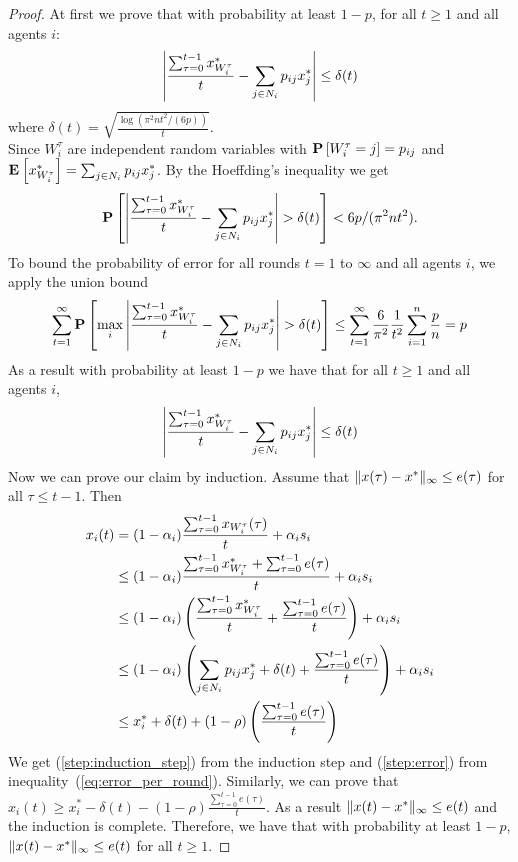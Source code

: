 \begin{proof}
At first we prove that with probability at least $1-p$,
for all $t \geq 1$ and all agents $i$:
\begin{equation}\label{eq:error_per_round}
    \left|
    \frac{\sum_{\tau=0}^{t-1} x^*_{W_i^\tau}}{t} -
    \sum_{j \in N_i} p_{ij} x^*_j
    \right| \leq \delta(t)
\end{equation}
where $\delta(t) = \sqrt{ \frac{\log(\pi^2 n t^2/(6 p))}{t}}$.\\
Since $W_i^\tau$ are independent random variables with
$\bm{\mathrm{P}}\left[W_i^\tau = j\right]=p_{ij}$ and \(\Exp{x^*_{W_i^\tau}} = \sum_{j \in N_i} p_{ij} x^*_j\).
By the Hoeffding's inequality we get
  \[
    \bm{\mathrm{P}}\left[
      \left|
      \frac{\sum_{\tau=0}^{t-1} x^*_{W_i^\tau}}{t}
      - \sum_{j \in N_i} p_{ij} x^*_j \right|
      > \delta(t)
     \right]
    < 6 p / (\pi^2 n t^2).
  \]
To bound the probability of error for all rounds $t=1$ to $\infty$
and all agents $i$, we apply the union bound
  \begin{align*}
    \sum_{t=1}^{\infty}
    \bm{\mathrm{P}}\left[ \max_{i}
      \left|
      \frac{\sum_{\tau=0}^{t-1} x^*_{W_i^{\tau}}}{t}
      - \sum_{j \in N_i} p_{ij} x^*_j \right|
      > \delta(t)\right]
    \leq
    \sum_{t=1}^{\infty} \frac{6}{\pi^2} \frac{1}{t^2} \sum_{i=1}^n \frac{p}{n} =
    p
  \end{align*}
\noindent As a result with probability at least $1-p$ we have that for all $t\geq 1$ and all agents $i$,
  \begin{equation}\label{eq:error_per_round}
    \left|
    \frac{\sum_{\tau=0}^{t-1} x^*_{W_i^\tau}}{t} -
    \sum_{j \in N_i} p_{ij} x^*_j
    \right| \leq \delta(t)
  \end{equation}
\noindent Now we can prove our claim by induction. Assume that $\| x(\tau)-x^* \|_{\infty} \leq e(\tau)$ for all
$\tau \leq t-1$. Then
\begin{align}
    x_i(t)
    &=
    (1-\alpha_i)\frac{\sum_{\tau=0}^{t-1}x_{W_i^{\tau}}(\tau)}{t}
    + \alpha_i s_i \nonumber \\
    &\leq
    (1-\alpha_i)\frac{\sum_{\tau=0}^{t-1}x^*_{W_i^{\tau}} +
      \sum_{\tau=0}^{t-1} e(\tau)}{t} + \alpha_i s_i \label{step:induction_step}\\
    &\leq
    (1-\alpha_i)
    \left(
    \frac{\sum_{\tau=0}^{t-1}x^*_{W_i^{\tau}}}{t}+
    \frac{\sum_{\tau=0}^{t-1} e(\tau)}{t}
    \right)
    + \alpha_i s_i \nonumber\\
    &\leq
    (1-\alpha_i)\left(\sum_{j \in N_i} p_{ij} x^*_{j} +
    \delta(t) + \frac{\sum_{\tau=0}^{t-1} e(\tau)}{t} \right) +
    \alpha_i s_i \label{step:error} \\
    &\leq
    x_i^* + \delta(t) + (1-\rho)
    \left(
    \frac{\sum_{\tau=0}^{t-1} e(\tau)}{t}
    \right)
    \nonumber
  \end{align}
  We get (\ref{step:induction_step}) from the induction step and
  (\ref{step:error}) from inequality~(\ref{eq:error_per_round}).
  Similarly, we can prove that
  $x_i(t) \geq x_i^* - \delta(t) - (1-\rho)
  \frac{\sum_{\tau=0}^{t-1} e(\tau)}{t}$.
  As a result $\| x(t)-x^* \|_{\infty} \leq e(t)$ and the induction
  is complete.  Therefore, we have that with probability at least $1-p$,
  \(\| x(t) - x^* \|_{\infty} \leq e(t)\) for all $t\geq 1$.
\end{proof}

